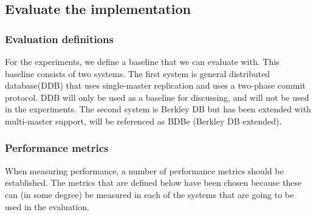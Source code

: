 
\subsection{Evaluate the implementation} 
\label{subsec:experiment}

\subsubsection{Evaluation definitions} %
\label{ssub:evaluation_baseline}

For the experiments, we define a baseline that we can evaluate with. This baseline consists of two systems. The first system is general distributed database(DDB) that uses single-master replication and uses a two-phase commit protocol. DDB will only be used as a baseline for discussing, and will not be used in the experiments. The second system is Berkley DB but has been extended with multi-master support, will be referenced as BDBe (Berkley DB extended). 


\subsubsection{Performance metrics} %
\label{ssub:performance_metrics_discussion}

When measuring performance, a number of performance metrics should be established. The metrics that are defined below have been chosen because these can (in some degree) be measured in each of the systems that are going to be used in the evaluation.

